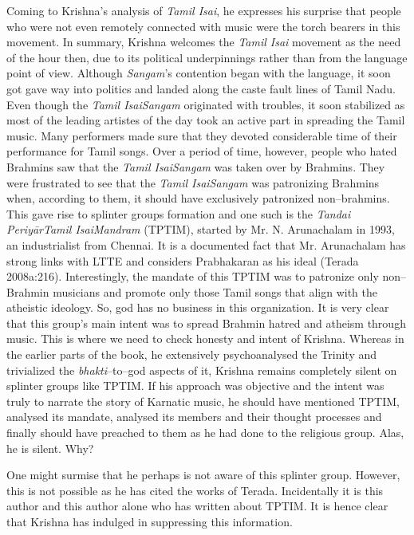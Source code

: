 Coming to Krishna’s analysis of \textit{Tamil Isai}, he expresses his surprise that people who were not even remotely connected with music were the torch bearers in this movement. In summary, Krishna welcomes the \textit{Tamil Isai} movement as the need of the hour then, due to its political underpinnings rather than from the language point of view. Although \textit{Sangam}’s contention began with the language, it soon got gave way into politics and landed along the caste fault lines of Tamil Nadu. Even though the \textit{Tamil IsaiSangam} originated with troubles, it soon stabilized as most of the leading artistes of the day took an active part in spreading the Tamil music. Many performers made sure that they devoted considerable time of their performance for Tamil songs. Over a period of time, however, people who hated Brahmins saw that the \textit{Tamil IsaiSangam} was taken over by Brahmins. They were frustrated to see that the \textit{Tamil IsaiSangam} was patronizing Brahmins when, according to them, it should have exclusively patronized non–brahmins. This gave rise to splinter groups formation and one such is the \textit{Tandai PeriyārTamil IsaiMandram} (TPTIM), started by Mr. N. Arunachalam in 1993, an industrialist from Chennai. It is a documented fact that Mr. Arunachalam has strong links with LTTE and considers Prabhakaran as his ideal (Terada 2008a:216). Interestingly, the mandate of this TPTIM was to patronize only non–Brahmin musicians and promote only those Tamil songs that align with the atheistic ideology. So, god has no business in this organization. It is very clear that this group’s main intent was to spread Brahmin hatred and atheism through music. This is where we need to check honesty and intent of Krishna. Whereas in the earlier parts of the book, he extensively psychoanalysed the Trinity and trivialized the \textit{bhakti}–to–god aspects of it, Krishna remains completely silent on splinter groups like TPTIM. If his approach was objective and the intent was truly to narrate the story of Karnatic music, he should have mentioned TPTIM, analysed its mandate, analysed its members and their thought processes and finally should have preached to them as he had done to the religious group. Alas, he is silent. Why?

One might surmise that he perhaps is not aware of this splinter group. However, this is not possible as he has cited the works of Terada. Incidentally it is this author and this author alone who has written about TPTIM. It is hence clear that Krishna has indulged in suppressing this information.

